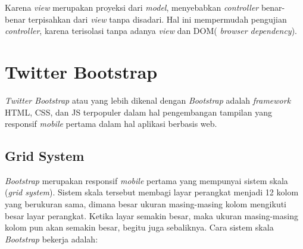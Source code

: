 		Karena \textit{view} merupakan proyeksi dari \textit{model}, menyebabkan \textit{controller} benar-benar terpisahkan dari \textit{view} tanpa disadari. Hal ini mempermudah pengujian \textit{controller}, karena terisolasi tanpa adanya \textit{view} dan DOM( \textit{browser dependency}).
		
		
\section{Twitter Bootstrap}
\label{sec: Bootrstrap}

	\textit{Twitter Bootstrap} atau yang lebih dikenal dengan \textit{Bootstrap} adalah \textit{framework} HTML, CSS, dan JS terpopuler dalam hal pengembangan tampilan yang responsif \textit{mobile} pertama dalam hal aplikasi berbasis web. 
	
	\subsection{Grid System}
	\label{sub: gridSystem}
	
	\textit{Bootstrap} merupakan responsif \textit{mobile} pertama yang mempunyai sistem skala (\textit{grid system}). Sistem skala tersebut membagi layar perangkat menjadi 12 kolom yang berukuran sama, dimana besar ukuran masing-masing kolom mengikuti besar layar perangkat. Ketika layar semakin besar, maka ukuran masing-masing kolom pun akan semakin besar, begitu juga sebaliknya. Cara sistem skala \textit{Bootstrap} bekerja adalah:
	
